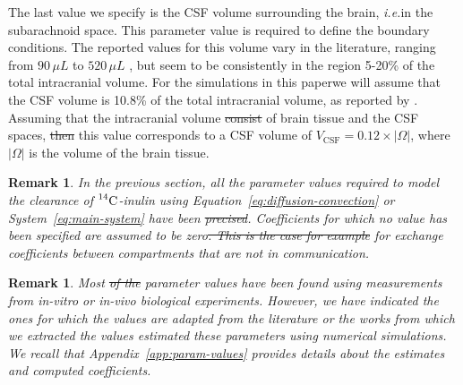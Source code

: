 \documentclass[a4paper,11pt]{article} %
\newcommand{\ie}{\emph{i.e.}\;}
\newcommand{\1}{^{(1)}}
\newcommand{\2}{^{(2)}}
\newcommand{\Cinulin}{$\prescript{14}{}{\text{C}}$-inulin }
\newtheorem{remark}[theorem]{Remark}
\providecommand{\DIFaddtex}[1]{{\protect\color{blue}\uwave{#1}}} %
\providecommand{\DIFdeltex}[1]{{\protect\color{red}\sout{#1}}}                      %
\providecommand{\DIFaddbegin}{} %
\providecommand{\DIFaddend}{} %
\providecommand{\DIFdelbegin}{} %
\providecommand{\DIFdelend}{} %
\providecommand{\DIFadd}[1]{\texorpdfstring{\DIFaddtex{#1}}{#1}} %
\providecommand{\DIFdel}[1]{\texorpdfstring{\DIFdeltex{#1}}{}} %
\newcommand{\DIFscaledelfig}{0.5}
\newlength{\DIFdelgraphicswidth} %
\newlength{\DIFdelgraphicsheight} %
\newcommand{\DIFaddincludegraphics}[2][]{{\color{blue}\fbox{\DIFOincludegraphics[#1]{#2}}}} %
\newcommand{\DIFdelincludegraphics}[2][]{%
\sbox{\DIFdelgraphicsbox}{\DIFOincludegraphics[#1]{#2}}%
\settoboxwidth{\DIFdelgraphicswidth}{\DIFdelgraphicsbox} %
\settoboxtotalheight{\DIFdelgraphicsheight}{\DIFdelgraphicsbox} %
\scalebox{\DIFscaledelfig}{%
\parbox[b]{\DIFdelgraphicswidth}{\usebox{\DIFdelgraphicsbox}\\[-\baselineskip] \rule{\DIFdelgraphicswidth}{0em}}\llap{\resizebox{\DIFdelgraphicswidth}{\DIFdelgraphicsheight}{%
\setlength{\unitlength}{\DIFdelgraphicswidth}%
\begin{picture}(1,1)%
\thicklines\linethickness{2pt} %
{\color[rgb]{1,0,0}\put(0,0){\framebox(1,1){}}}%
{\color[rgb]{1,0,0}\put(0,0){\line( 1,1){1}}}%
{\color[rgb]{1,0,0}\put(0,1){\line(1,-1){1}}}%
\end{picture}%
}\hspace*{3pt}}} %
} %
\DeclareRobustCommand{\DIFaddbegin}{\DIFOaddbegin \let\includegraphics\DIFaddincludegraphics} %
\DeclareRobustCommand{\DIFaddend}{\DIFOaddend \let\includegraphics\DIFOincludegraphics} %
\DeclareRobustCommand{\DIFdelbegin}{\DIFOdelbegin \let\includegraphics\DIFdelincludegraphics} %
\DeclareRobustCommand{\DIFdelend}{\DIFOaddend \let\includegraphics\DIFOincludegraphics} %
\begin{document}
\DIFdelend The last value we specify is the CSF volume surrounding the brain, \ie in the subarachnoid space. This parameter value is required to define the boundary conditions.  
The reported values for this volume vary in the literature, ranging from $90 \, \si{\mu L}$ \cite{pardridge2011drug} to $520 \, \si{\mu L}$ \cite{lai1983sampling}, but seem to be consistently in the region 5-20\% of the total intracranial volume. For the simulations in this paper\DIFaddbegin \DIFadd{, }\DIFaddend we will assume that the CSF volume is 10.8\% of the total intracranial volume, as reported by \cite{murtha2014cerebrospinal}. Assuming that the intracranial volume \DIFdelbegin \DIFdel{consist }\DIFdelend \DIFaddbegin \DIFadd{consists }\DIFaddend of brain tissue and the CSF spaces, \DIFdelbegin \DIFdel{then }\DIFdelend this value corresponds to a CSF volume of $V_\text{CSF} = 0.12\times |\Omega|$, where $|\Omega|$ is the volume of the brain tissue.

\begin{remark}
In the previous section, all the parameter values required to model the clearance of \Cinulin using Equation~\eqref{eq:diffusion-convection} or System~\eqref{eq:main-system} have been \DIFdelbegin \DIFdel{precised}\DIFdelend \DIFaddbegin \DIFadd{specified}\DIFaddend . Coefficients for which no value has been specified are assumed to be zero\DIFdelbegin \DIFdel{. This is the case for example }\DIFdelend \DIFaddbegin \DIFadd{, e.g. }\DIFaddend for exchange coefficients between compartments that are not in communication.
\end{remark}

\begin{remark}
Most \DIFdelbegin \DIFdel{of the }\DIFdelend parameter values have been found using measurements from \textit{in-vitro} or \textit{in-vivo} biological experiments. However, we have indicated the ones for which the values are adapted from the literature or the works from which we extracted the values \DIFaddbegin \DIFadd{and }\DIFaddend estimated these parameters using numerical simulations. We recall that Appendix~\ref{app:param-values} provides details about the estimates and computed coefficients.
\end{remark}
\end{document}
